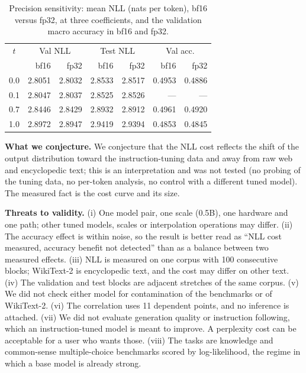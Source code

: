 \documentclass[conference]{IEEEtran}
\begin{document}
\begin{table}[!t]
\caption{Precision sensitivity: mean NLL (nats per token), bf16 versus fp32, at three coefficients, and the validation macro accuracy in bf16 and fp32.}
\label{tab:fp32}
\centering
\footnotesize\setlength{\tabcolsep}{3pt}
\begin{tabular}{crrrrrr}
\toprule
$t$ & \multicolumn{2}{c}{Val NLL} & \multicolumn{2}{c}{Test NLL} & \multicolumn{2}{c}{Val acc.} \\
& bf16 & fp32 & bf16 & fp32 & bf16 & fp32 \\
\midrule
0.0 & 2.8051 & 2.8032 & 2.8533 & 2.8517 & 0.4953 & 0.4886 \\
0.1 & 2.8047 & 2.8037 & 2.8525 & 2.8526 & --- & --- \\
0.7 & 2.8446 & 2.8429 & 2.8932 & 2.8912 & 0.4961 & 0.4920 \\
1.0 & 2.8972 & 2.8947 & 2.9419 & 2.9394 & 0.4853 & 0.4845 \\
\bottomrule
\end{tabular}
\end{table}

\textbf{What we conjecture.} We conjecture that the NLL cost reflects the shift of the output distribution toward the instruction-tuning data and away from raw web and encyclopedic text; this is an interpretation and was not tested (no probing of the tuning data, no per-token analysis, no control with a different tuned model). The measured fact is the cost curve and its size.

\textbf{Threats to validity.} (i) One model pair, one scale (0.5B), one hardware and one path; other tuned models, scales or interpolation operations may differ. (ii) The accuracy effect is within noise, so the result is better read as ``NLL cost measured, accuracy benefit not detected'' than as a balance between two measured effects. (iii) NLL is measured on one corpus with 100 consecutive blocks; WikiText-2 is encyclopedic text, and the cost may differ on other text. (iv) The validation and test blocks are adjacent stretches of the same corpus. (v) We did not check either model for contamination of the benchmarks or of WikiText-2. (vi) The correlation uses 11 dependent points, and no inference is attached. (vii) We did not evaluate generation quality or instruction following, which an instruction-tuned model is meant to improve. A perplexity cost can be acceptable for a user who wants those. (viii) The tasks are knowledge and common-sense multiple-choice benchmarks scored by log-likelihood, the regime in which a base model is already strong.
\end{document}
